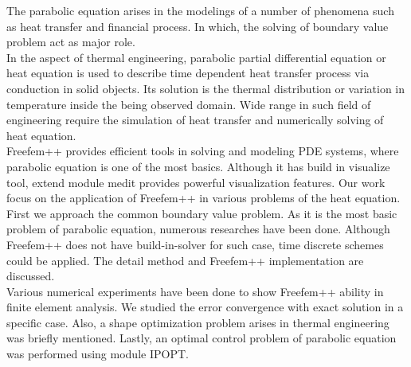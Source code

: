 \quad The parabolic equation arises in the modelings of a number of phenomena such as heat transfer and financial process. In which, the solving of boundary value problem act as major role.\\

In the aspect of thermal engineering, parabolic partial differential equation or heat equation is used to describe time dependent heat transfer process via conduction in solid objects. Its solution is the thermal distribution or variation in temperature inside the being observed domain. Wide range in such field of engineering require the simulation of heat transfer and numerically solving of heat equation.\\

Freefem++ provides efficient tools in solving and modeling PDE systems, where parabolic equation is one of the most basics. Although it has build in visualize tool, extend module medit provides powerful visualization features. Our work focus on the application of Freefem++ in various problems of the heat equation.\\

First we approach the common boundary value problem. As it is the most basic problem of parabolic equation, numerous researches have been done. Although Freefem++ does not have build-in-solver for such case, time discrete schemes could be applied. The detail method and Freefem++ implementation are discussed.\\

Various numerical experiments have been done to show Freefem++ ability in finite element analysis. We studied the error convergence with exact solution in a specific case. Also, a shape optimization problem arises in thermal engineering was briefly mentioned. Lastly, an optimal control problem of parabolic equation was performed using module IPOPT.
